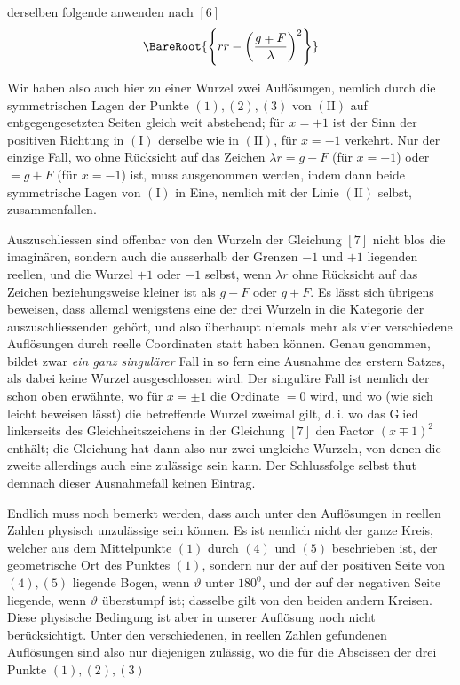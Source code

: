 %
derselben folgende anwenden nach \([6]\)
\[\BareRoot{\left\{rr-\left(\frac{g\mp F}{\lambda}\right)^2\right\}}\]
\par
Wir haben also auch hier zu einer Wurzel zwei Auflösungen, nemlich durch die symmetrischen Lagen der Punkte \((1),(2),(3)\) von \(\mathrm{(II)}\) auf entgegengesetzten Seiten gleich weit abstehend; für \(x=+1\) ist der Sinn der positiven Richtung in \(\mathrm{(I)}\) derselbe wie in \(\mathrm{(II)}\), für \(x=-1\) verkehrt. Nur der einzige Fall, wo ohne Rücksicht auf das Zeichen \(\lambda r=g-F\) (für \(x=+1\)) oder \(=g+F\) (für \(x=-1\)) ist, muss ausgenommen werden, indem dann beide symmetrische Lagen von \(\mathrm{(I)}\) in Eine, nemlich mit der Linie \(\mathrm{(II)}\) selbst, zusammenfallen.

Auszuschliessen sind offenbar von den Wurzeln der Gleichung \([7]\) nicht blos die imaginären, sondern auch die ausserhalb der Grenzen \(-1\) und \(+1\) liegenden reellen, und die Wurzel \(+1\) oder \(-1\) selbst, wenn \(\lambda r\) ohne Rücksicht auf das Zeichen beziehungsweise kleiner ist als \(g-F\) oder \(g+F\). Es lässt sich übrigens beweisen, dass allemal wenigstens eine der drei Wurzeln in die Kategorie der auszuschliessenden gehört, und also überhaupt niemals mehr als vier verschiedene Auflösungen durch reelle Coordinaten statt haben können. Genau genommen, bildet zwar \textit{ein ganz singulärer} Fall in so fern eine Ausnahme des erstern Satzes, als dabei keine Wurzel ausgeschlossen wird. Der singuläre Fall ist nemlich der schon oben erwähnte, wo für \(x=\pm1\) die Ordinate \(=0\) wird, und wo (wie sich leicht beweisen lässt) die betreffende Wurzel zweimal gilt, d.\,i. wo das Glied linkerseits des Gleichheitszeichens in der Gleichung \([7]\) den Factor \((x\mp1)^2\) enthält; die Gleichung hat dann also nur zwei ungleiche Wurzeln, von denen die zweite allerdings auch eine zulässige sein kann. Der Schlussfolge selbst thut demnach dieser Ausnahmefall keinen Eintrag.

Endlich muss noch bemerkt werden, dass auch unter den Auflösungen in reellen Zahlen physisch unzulässige sein können. Es ist nemlich nicht der ganze Kreis, welcher aus dem Mittelpunkte \((1)\) durch \((4)\) und \((5)\) beschrieben ist, der geometrische Ort des Punktes \((1)\), sondern nur der auf der positiven Seite von \((4),(5)\) liegende Bogen, wenn \(\vartheta\) unter \(180^0\), und der auf der negativen Seite liegende, wenn \(\vartheta\) überstumpf ist; dasselbe gilt von den beiden andern Kreisen. Diese physische Bedingung ist aber in unserer Auflösung noch nicht berücksichtigt. Unter den verschiedenen, in reellen Zahlen gefundenen Auflösungen sind also nur diejenigen zulässig, wo die für die Abscissen der drei Punkte \((1),(2),(3)\)
